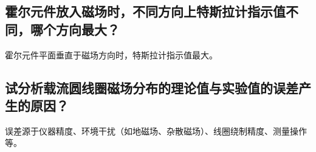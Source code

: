 \documentclass[]{../template/Report}%
\begin{document}
\begin{fullreportonly}
\subsection{霍尔元件放入磁场时，不同方向上特斯拉计指示值不同，哪个方向最大？}
霍尔元件平面垂直于磁场方向时，特斯拉计指示值最大。
\subsection{试分析载流圆线圈磁场分布的理论值与实验值的误差产生的原因？}误差源于仪器精度、环境干扰（如地磁场、杂散磁场）、线圈绕制精度、测量操作等。
\end{fullreportonly}
\insertnotes
\end{document}
